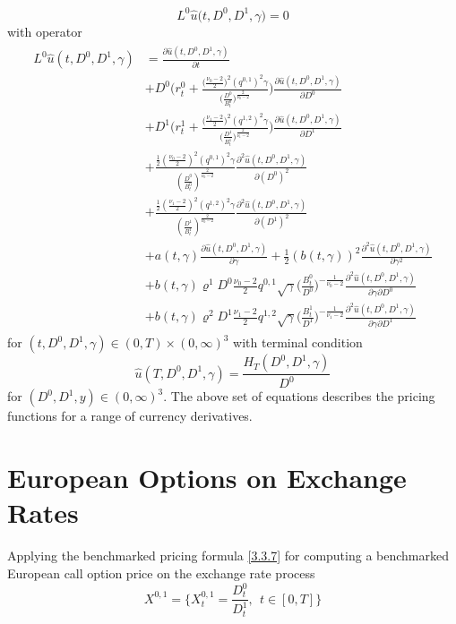 \documentclass[a4 paper, 12pt]{report}
\theoremstyle{plain}
\begin{document}
\begin{equation}\label{5.6}
L^0\hat{u}\bigg(t, D^0, D^1, \gamma\bigg) = 0
\end{equation}
with operator 
\begin{align}\label{5.7}
\begin{split}
L^0\hat{u}(t, D^0,D^1,\gamma)& = \frac{\partial\hat{u}(t, D^0, D^1,\gamma)}{\partial t}\\
&+ D^0\bigg(r_t^0+\frac{\bigg(\frac{\nu_0-2}{2}\bigg)^2(q^{0,1})^2\gamma}{\bigg(\frac{D^0}{B_t^0}\bigg)^{\frac{2}{\nu_0 - 2}}}\bigg)\frac{\partial\hat{u}(t,D^0,D^1,\gamma)}{\partial D^0}\\
&+ D^1\bigg(r_t^1+\frac{\bigg(\frac{\nu_1-2}{2}\bigg)^2(q^{1,2})^2\gamma}{\bigg(\frac{D^1}{B_t^1}\bigg)^{\frac{2}{\nu_1 - 2}}}\bigg)\frac{\partial\hat{u}(t,D^0,D^1,\gamma)}{\partial D^1}\\
&+\frac{\frac{1}{2}(\frac{\nu_0 - 2}{2})^2(q^{0,1})^2\gamma}{(\frac{D^0}{B_t^0})^{\frac{2}{\nu_0-2}}}\frac{\partial^2\hat{u}(t,D^0, D^1,\gamma)}{\partial(D^0)^2}\\
&+\frac{\frac{1}{2}(\frac{\nu_1 - 2}{2})^2(q^{1,2})^2\gamma}{(\frac{D^1}{B_t^1})^{\frac{2}{\nu_0-2}}}\frac{\partial^2\hat{u}(t,D^0, D^1,\gamma)}{\partial(D^1)^2}\\
&+a(t,\gamma)\frac{\partial\hat{u}(t, D^0, D^1, \gamma)}{\partial \gamma}+\frac{1}{2}(b(t,\gamma))^2\frac{\partial^2\hat{u}(t, D^0, D^1, \gamma)}{\partial \gamma^2}\\
&+b(t,\gamma)\varrho^1 D^0\frac{\nu_0-2}{2}q^{0,1}\sqrt{\gamma}\bigg(\frac{B_t^0}{D^0}\bigg)^{-\frac{1}{\nu_0 - 2}}\frac{\partial^2\hat{u}(t,D^0,D^1,\gamma)}{\partial\gamma\partial D^0}\\
&+b(t,\gamma)\varrho^2 D^1\frac{\nu_1-2}{2}q^{1,2}\sqrt{\gamma}\bigg(\frac{B_t^1}{D^1}\bigg)^{-\frac{1}{\nu_1 - 2}}\frac{\partial^2\hat{u}(t,D^0,D^1,\gamma)}{\partial\gamma\partial D^1}
\end{split}
\end{align}
for $(t,D^0,D^1,\gamma)\in(0,T)\times (0,\infty)^3$ with terminal condition
\begin{equation}\label{5.8}
\hat{u}(T,D^0,D^1,\gamma) = \frac{H_T(D^0,D^1,\gamma)}{D^0}
\end{equation}
for $(D^0,D^1,y)\in(0,\infty)^3$. The above set of equations describes the pricing functions for a range of currency derivatives.

\section{European Options on Exchange Rates}
\noindent
\par Applying the benchmarked pricing formula \eqref{3.3.7} for computing a
benchmarked European call option price on the exchange rate process
$$
X^{0,1} = \{X_t^{0,1} = \frac{D_t^0}{D_t^1},~~t\in[0,T]\}
$$
\end{document}
